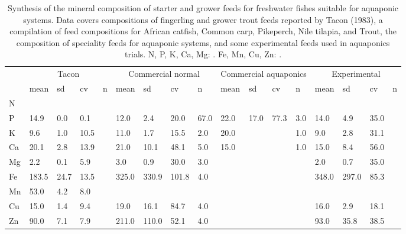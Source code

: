 \begin{sidewaystable}
\centering
  \caption{Synthesis of the mineral composition of starter and grower feeds for freshwater fishes suitable for aquaponic systems. Data covers compositions of fingerling and grower trout feeds reported by Tacon (1983), a compilation of feed compositions for African catfish, Common carp, Pikeperch, Nile tilapia, and Trout, the composition of speciality feeds for aquaponic systems, and some experimental feeds used in aquaponics trials. N, P, K, Ca, Mg: \si{\gkg}. Fe, Mn, Cu, Zn: \si{\mgkg}.}
  \label{tab:feedcomp}
  \begin{tabularx}{\textwidth}{XXXXXXXXXXXXXXXXX}

\toprule

  &\multicolumn{4}{c}{Tacon}  & \multicolumn{4}{c}{Commercial normal} & \multicolumn{4}{c}{Commercial aquaponics} & \multicolumn{4}{c}{Experimental} \\
  \cline{2-5}\cline{6-9}\cline{10-13}\cline{14-17}
  & mean  & sd  & cv  & n & mean  & sd  & cv  & n & mean  & sd  & cv  & n & mean  & sd  & cv  & n \\

\midrule

N&&&&&&&&&&&&&&&&\\
P&14.9&0.0&0.1&&12.0&2.4&20.0&67.0&22.0&17.0&77.3&3.0&14.0&4.9&35.0&\\
K&9.6&1.0&10.5&&11.0&1.7&15.5&2.0&20.0&&&1.0&9.0&2.8&31.1&\\
Ca&20.1&2.8&13.9&&21.0&10.1&48.1&5.0&15.0&&&1.0&15.0&8.4&56.0&\\
Mg&2.2&0.1&5.9&&3.0&0.9&30.0&3.0&&&&&2.0&0.7&35.0&\\
Fe&183.5&24.7&13.5&&325.0&330.9&101.8&4.0&&&&&348.0&297.0&85.3&\\
Mn&53.0&4.2&8.0&&&&&&&&&&&&&\\
Cu&15.0&1.4&9.4&&19.0&16.1&84.7&4.0&&&&&16.0&2.9&18.1&\\
Zn&90.0&7.1&7.9&&211.0&110.0&52.1&4.0&&&&&93.0&35.8&38.5&\\

\bottomrule

  \end{tabularx}
\end{sidewaystable}